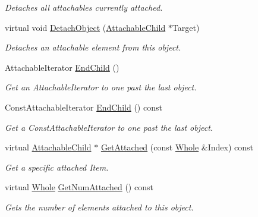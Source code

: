 \begin{DoxyCompactItemize}
\begin{DoxyCompactList}\small\item\em Detaches all attachables currently attached. \item\end{DoxyCompactList}\item 
virtual void \hyperlink{classMezzanine_1_1AttachableParent_a500741267623cad0e0748fe0a4b5e69c}{DetachObject} (\hyperlink{classMezzanine_1_1AttachableChild}{AttachableChild} $\ast$Target)
\begin{DoxyCompactList}\small\item\em Detaches an attachable element from this object. \item\end{DoxyCompactList}\item 
AttachableIterator \hyperlink{classMezzanine_1_1AttachableParent_a6a5f5c9e1bf1838113405aa3439e14e4}{EndChild} ()
\begin{DoxyCompactList}\small\item\em Get an AttachableIterator to one past the last object. \item\end{DoxyCompactList}\item 
ConstAttachableIterator \hyperlink{classMezzanine_1_1AttachableParent_a6ccdced33c9b32be3ad71a195c9aff20}{EndChild} () const 
\begin{DoxyCompactList}\small\item\em Get a ConstAttachableIterator to one past the last object. \item\end{DoxyCompactList}\item 
virtual \hyperlink{classMezzanine_1_1AttachableChild}{AttachableChild} $\ast$ \hyperlink{classMezzanine_1_1AttachableParent_a89d0d1d85a40385d1482ae5443d1ecf1}{GetAttached} (const \hyperlink{namespaceMezzanine_adcbb6ce6d1eb4379d109e51171e2e493}{Whole} \&Index) const 
\begin{DoxyCompactList}\small\item\em Get a specific attached Item. \item\end{DoxyCompactList}\item 
virtual \hyperlink{namespaceMezzanine_adcbb6ce6d1eb4379d109e51171e2e493}{Whole} \hyperlink{classMezzanine_1_1AttachableParent_aebacb49f238c0421cd790cacd5baba9c}{GetNumAttached} () const 
\begin{DoxyCompactList}\small\item\em Gets the number of elements attached to this object. \item\end{DoxyCompactList}\end{DoxyCompactItemize}
